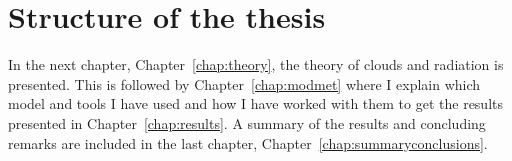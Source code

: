 





\section{Structure of the thesis}
In the next chapter, Chapter~\ref{chap:theory}, the theory of clouds and radiation is presented. This is followed by Chapter~\ref{chap:modmet} where I explain which model and tools I have used and how I have worked with them to get the results presented in Chapter~\ref{chap:results}. A summary of the results and concluding remarks are included in the last chapter, Chapter~\ref{chap:summaryconclusions}.